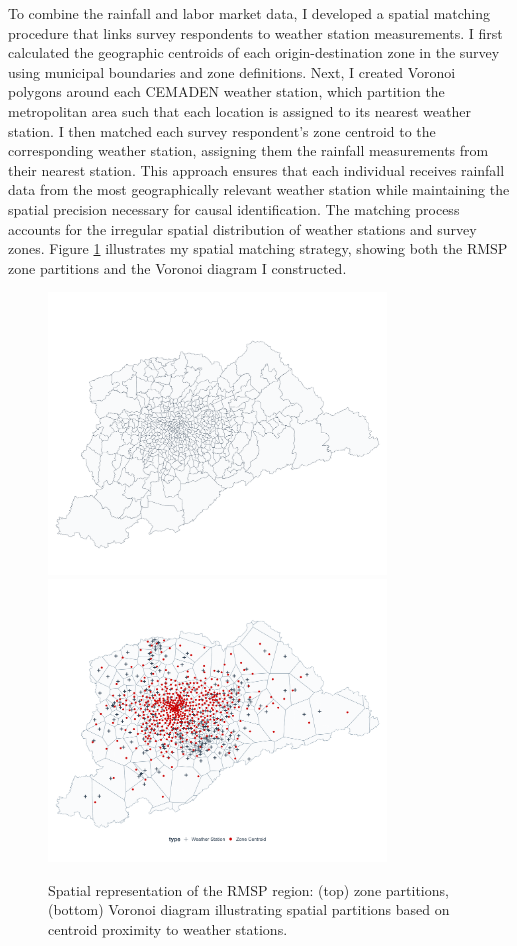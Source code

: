 To combine the rainfall and labor market data, I developed a spatial matching procedure that links survey respondents to weather station measurements. I first calculated the geographic centroids of each origin-destination zone in the survey using municipal boundaries and zone definitions. Next, I created Voronoi polygons around each CEMADEN weather station, which partition the metropolitan area such that each location is assigned to its nearest weather station. I then matched each survey respondent's zone centroid to the corresponding weather station, assigning them the rainfall measurements from their nearest station. This approach ensures that each individual receives rainfall data from the most geographically relevant weather station while maintaining the spatial precision necessary for causal identification. The matching process accounts for the irregular spatial distribution of weather stations and survey zones. Figure \ref{fig:rmsp_voronoi} illustrates my spatial matching strategy, showing both the RMSP zone partitions and the Voronoi diagram I constructed.

\begin{figure}[H]
    \centering
    \includegraphics[width=0.8\textwidth]{../figures/rmsp_base.png}
    \includegraphics[width=0.8\textwidth]{../figures/rmsp_voronoi.png}
    \caption{Spatial representation of the RMSP region: (top) zone partitions, (bottom) Voronoi diagram illustrating spatial partitions based on centroid proximity to weather stations.}
    \label{fig:rmsp_voronoi}
\end{figure}

